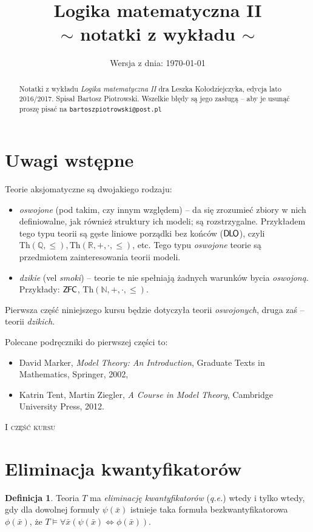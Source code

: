 \documentclass{article}
\title{\textbf{Logika matematyczna II} \\
\Large{$\sim$ notatki z wykładu $\sim$}}
\date{\small{Wersja z dnia: \today}}
\newcommand{\N}{\mathbb{N}}
\newcommand{\Q}{\mathbb{Q}}
\newcommand{\R}{\mathbb{R}}
\theoremstyle{plain}
\theoremstyle{definition}
\newtheorem{df}[thm]{Definicja}
\theoremstyle{remark}
\newcommand{\ZFC}{\mathsf{Z \mkern-1.6mu F \mkern-1.5mu C}}
\newcommand{\DLO}{\mathsf{D \mkern-1.5mu L \mkern-1.8mu O}}
\newcommand{\wtw}{wtedy i tylko wtedy, gdy }
\newcommand{\Th}{\text{Th}}
\begin{document}
\maketitle

\begin{abstract}
	\hspace{-0.5cm}Notatki z wykładu \textit{Logika matematyczna II} dra
	Leszka Kołodziejczyka, edycja lato 2016/2017. Spisał Bartosz
	Piotrowski. Wszelkie błędy są jego zasługą -- aby je usunąć proszę
	pisać na \texttt{bartoszpiotrowski@post.pl}
\end{abstract}

\section*{Uwagi wstępne}
Teorie aksjomatyczne są dwojakiego rodzaju:
\begin{itemize}
	\item \textit{oswojone} (pod takim, czy innym względem) -- da się
		zrozumieć zbiory w nich definiowalne, jak również struktury ich
		modeli; są rozstrzygalne. Przykładem tego typu teorii są gęste
		liniowe porządki bez końców ($\DLO$), czyli $\Th(\Q, \leq),
		\Th(\R, +, \cdot, \leq)$, etc. Tego typu \textit{oswojone}
		teorie są przedmiotem zainteresowania teorii modeli.
	\item \textit{dzikie} (vel \textit{smoki}) -- teorie te nie spełniają
		żadnych warunków bycia \textit{oswojoną}. Przykłady: $\ZFC$,
		$\Th(\N, +, \cdot, \leq)$.
\end{itemize}
Pierwsza część niniejszego kursu będzie dotyczyła teorii \textit{oswojonych},
druga zaś -- teorii \textit{dzikich}.

Polecane podręczniki do pierwszej części to:
\begin{itemize}
	\item David Marker, \textit{Model Theory: An Introduction}, Graduate
		Texts in Mathematics, Springer, 2002,
	\item Katrin Tent, Martin Ziegler, \textit{A Course in Model Theory},
		Cambridge University Press, 2012.
\end{itemize}

\newpage
\begin{center}
{\Large \textsc{I część kursu}}
\end{center}
\vspace{-0.4cm}

\section{Eliminacja kwantyfikatorów}
\begin{df}
	Teoria $T$ ma \textit{eliminację kwantyfikatorów} (\textit{q.e.}) \wtw dla
	dowolnej formuły $\psi(\bar{x})$ istnieje taka formuła
	bezkwantyfikatorowa $\phi(\bar{x})$, że $T \models \forall {\bar{x}}
	(\psi(\bar{x}) \iff \phi(\bar{x}))$.
\end{df}
\end{document}
